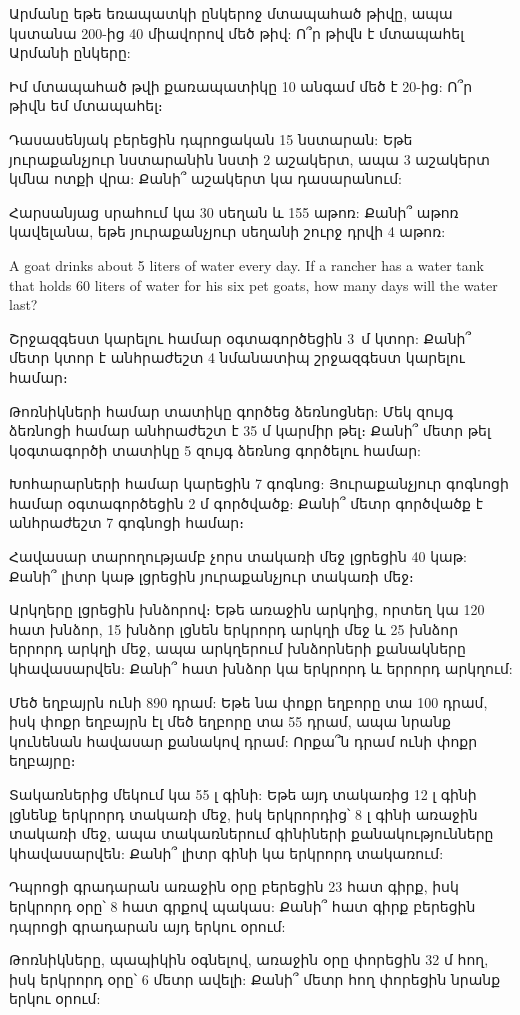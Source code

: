 \problem
Արմանը եթե եռապատկի ընկերոջ մտապահած թիվը, ապա կստանա 
200-ից 40 միավորով մեծ թիվ: Ո՞ր թիվն է մտապահել Արմանի 
ընկերը:

\problem
Իմ մտապահած թվի քառապատիկը 10 անգամ մեծ է 20-ից: Ո՞ր 
թիվն եմ մտապահել։

\problem
Դասասենյակ բերեցին դպրոցական 15 նստարան: Եթե յուրաքանչյուր 
նստարանին նստի 2 աշակերտ, ապա 3 աշակերտ կմնա ոտքի վրա: 
Քանի՞ աշակերտ կա դասարանում:

\problem
Հարսանյաց սրահում կա 30 սեղան և 155 աթոռ: Քանի՞ աթոռ 
կավելանա, եթե յուրաքանչյուր սեղանի շուրջ դրվի 4 աթոռ:

\problem
A goat drinks about 5 liters of water every day. If a 
rancher has a water tank that holds 60 liters of water 
for his six pet goats, how many days will the water last?

\problem
Շրջազգեստ կարելու համար օգտագործեցին 3~մ կտոր: Քանի՞ 
մետր կտոր է անհրաժեշտ 4 նմանատիպ շրջազգեստ կարելու համար։

\problem
Թոռնիկների համար տատիկը գործեց ձեռնոցներ: Մեկ զույգ 
ձեռնոցի համար անհրաժեշտ է 35 մ կարմիր թել։ Քանի՞ մետր 
թել կօգտագործի տատիկը 5 զույգ ձեռնոց գործելու համար:

\problem
Խոհարարների համար կարեցին 7 գոգնոց: Յուրաքանչյուր 
գոգնոցի համար օգտագործեցին 2 մ գործվածք: Քանի՞ մետր 
գործվածք է անհրաժեշտ 7 գոգնոցի համար։

\problem
Հավասար տարողությամբ չորս տակառի մեջ լցրեցին 40 կաթ: 
Քանի՞ լիտր կաթ լցրեցին յուրաքանչյուր տակառի մեջ։

\problem
Արկղերը լցրեցին խնձորով։ Եթե առաջին արկղից, որտեղ կա 120 
հատ խնձոր, 15 խնձոր լցնեն երկրորդ արկղի մեջ և 25 խնձոր 
երրորդ արկղի մեջ, ապա արկղերում խնձորների քանակները 
կհավասարվեն: Քանի՞ հատ խնձոր կա երկրորդ և երրորդ արկղում:

\problem
Մեծ եղբայրն ունի 890 դրամ: Եթե նա փոքր եղբորը տա 100 դրամ, 
իսկ փոքր եղբայրն էլ մեծ եղբորը տա 55 դրամ, ապա նրանք կունենան 
հավասար քանակով դրամ: Որքա՞ն դրամ ունի փոքր եղբայրը։

\problem
Տակառներից մեկում կա 55 լ գինի: Եթե այդ տակառից 12 լ 
գինի լցնենք երկրորդ տակառի մեջ, իսկ երկրորդից՝ 8 լ գինի 
առաջին տակառի մեջ, ապա տակառներում գինիների քանակությունները 
կհավասարվեն: Քանի՞ լիտր գինի կա երկրորդ տակառում:

\problem
Դպրոցի գրադարան առաջին օրը բերեցին 23 հատ գիրք, իսկ երկրորդ 
օրը՝ 8 հատ գրքով պակաս: Քանի՞ հատ գիրք բերեցին դպրոցի գրադարան 
այդ երկու օրում:

\problem
Թոռնիկները, պապիկին օգնելով, առաջին օրը փորեցին 32 մ հող, իսկ 
երկրորդ օրը՝ 6 մետր ավելի: Քանի՞ մետր հող փորեցին նրանք երկու օրում:

